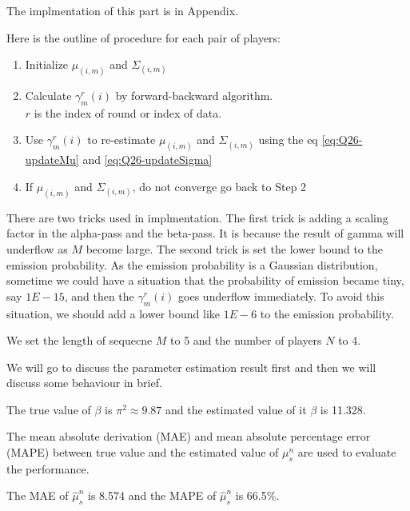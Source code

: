 \documentclass[12pt]{article}
\newenvironment{problem}[2][Problem]{\begin{trivlist}
\item[\hskip \labelsep {\bfseries #1}\hskip \labelsep {\bfseries #2.}]}{\end{trivlist}}
\begin{document}
\begin{problem}{2.6.19}
The implmentation of this part is in Appendix.

Here is the outline of procedure for each pair of players:
\begin{enumerate}[Step 1:]
    \item Initialize $\mu_{(i,m)}$ and $\Sigma_{(i,m)}$
    \item Calculate $\gamma^{r}_{m}(i)$ by forward-backward algorithm. \\
          $r$ is the index of round or index of data.
    \item Use $\gamma^{r}_{m}(i)$ to re-estimate $\mu_{(i,m)}$ and $\Sigma_{(i,m)}$
            using the eq \eqref{eq:Q26-updateMu} and \eqref{eq:Q26-updateSigma}
    \item If $\mu_{(i,m)}$ and $\Sigma_{(i,m)}$, do not converge go back to Step 2
\end{enumerate}

There are two tricks used in implmentation. The first trick is adding a scaling
factor in the alpha-pass and the beta-pass. It is because the result of gamma will 
underflow as $M$ become large. The second trick is set the lower bound to the 
emission probability. As the emission probability is a Gaussian distribution, 
sometime we could have a situation that the probability of emission became tiny,
say $1E-15$, and then the $\gamma^{r}_{m}(i)$ goes underflow immediately. To avoid
this situation, we should add a lower bound like $1E-6$ to the emission probability.
\end{problem}
\begin{problem}{2.6.20}
We set the length of sequecne $M$ to 5 and the number of players $N$ to 4.

We will go to discuss the parameter estimation result first and then we will 
discuss some behaviour in brief.

The true value of $\beta$ is $\pi^2 \approx 9.87$ and the estimated value of it
$\beta$ is 11.328.

The mean absolute derivation (MAE) and mean absolute percentage error (MAPE) 
between true value and the estimated value of $\mu^{n}_{s}$ are used to evaluate
the performance.

The MAE of $\hat{\mu}^{n}_{s}$ is 8.574 and the MAPE of $\hat{\mu}^{n}_{s}$ is 
66.5\%.

\end{problem}
\pagebreak
\end{document}
